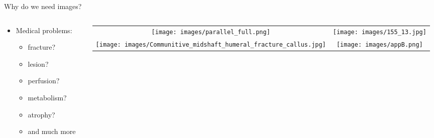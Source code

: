 \begin{frame}[c]{Why do we need images?}

	\begin{columns}[c]
		\begin{column}{0.4\textwidth}

			\begin{itemize}
				\item Medical problems:
				      \begin{itemize}
					      \item fracture?
					      \item lesion?
					      \item perfusion?
					      \item metabolism?
					      \item atrophy?
					      \item and much more
				      \end{itemize}
			\end{itemize}
		\end{column}\begin{column}{0.5\textwidth}
			\begin{tabular}{cc}
				\texttt{[image: images/parallel\_full.png]}                                                               & \texttt{[image: images/155\_13.jpg]} \\
				\texttt{[image: images/Communitive\_midshaft\_humeral\_fracture\_callus.jpg]} &
				\texttt{[image: images/appB.png]}%
			\end{tabular}
		\end{column}
	\end{columns}

\end{frame}

